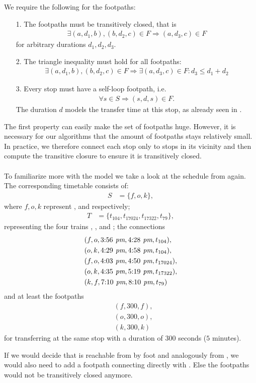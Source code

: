 	We require the following for the footpaths:
	\begin{itemize}
		\item[1.] The footpaths must be transitively closed, that is
			\begin{align*}
				\exists (a, d_1, b), (b, d_2, c) \in F \Rightarrow (a, d_3, c) \in F
			\end{align*}
			for arbitrary durations $d_1, d_2, d_3$.
		\item[2.] The triangle inequality must hold for all footpaths:
			\begin{align*}
				\exists (a, d_1, b), (b, d_2, c) \in F \Rightarrow \exists (a, d_3, c) \in F: d_3 \le d_1 + d_2
			\end{align*}
		\item[3.] Every stop must have a self-loop footpath, i.e.
			\begin{align*}
				\forall s \in S \Rightarrow (s, d, s) \in F.
			\end{align*}
			The duration $d$ models the transfer time at this stop, as already
			seen in .
	\end{itemize}
	The first property can easily make the set of footpaths huge. However, it is necessary for our algorithms that the
	amount of footpaths stays relatively small. In practice, we therefore connect each stop only to stops in its vicinity
	and then compute the transitive closure to ensure it is transitively closed.\\\\
	To familiarize more with the model we take a look at the schedule from  again.
	The corresponding timetable consists of:
	\begin{align*}
		S	&= \{f, o, k\},
	\end{align*}
	where $f, o, k$ represent \freiburg, \offenburg and \karlsruhe respectively;
	\begin{align*}
		T	&= \{t_{104}, t_{17024}, t_{17322}, t_{79}\},
	\end{align*}
	representing the four trains \ticef, \tregiof, \tregios and \tices; the connections
	\begin{align*}
		&(f, o, 3\text{:}56\textit{ pm}, 4\text{:}28\textit{ pm}, t_{104}),\\
		&(o, k, 4\text{:}29\textit{ pm}, 4\text{:}58\textit{ pm}, t_{104}),\\
		&(f, o, 4\text{:}03\textit{ pm}, 4\text{:}50\textit{ pm}, t_{17024}),\\
		&(o, k, 4\text{:}35\textit{ pm}, 5\text{:}19\textit{ pm}, t_{17322}),\\
		&(k, f, 7\text{:}10\textit{ pm}, 8\text{:}10\textit{ pm}, t_{79})
	\end{align*}
	and at least the footpaths
	\begin{align*}
		&(f, 300, f),\\
		&(o, 300, o),\\
		&(k, 300, k)
	\end{align*}
	for transferring at the same stop with a duration of $300$ seconds ($5$ minutes).
	
	If we would decide that \offenburg is reachable from \freiburg by foot and analogously \karlsruhe from
	\offenburg, we would also need to add a footpath connecting \freiburg directly with \karlsruhe.
	Else the footpaths would not be transitively closed anymore.